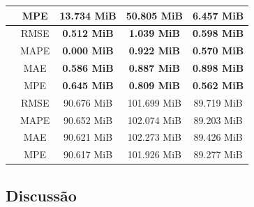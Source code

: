 \begin{table}[!htp]
\begin{tabular}{|c|c|ccc|}
        \rowcolor[HTML]{EFEFEF}
        \multirow{-4}{*}{\cellcolor[HTML]{C0C0C0}ARIMA}   & MPE                                               & \multicolumn{1}{c|}{\cellcolor[HTML]{EFEFEF}13.734 MiB}         & \multicolumn{1}{c|}{\cellcolor[HTML]{EFEFEF}50.805 MiB}         & 6.457 MiB          \\ \hline
        \cellcolor[HTML]{C0C0C0}                          & RMSE                                              & \multicolumn{1}{c|}{\textbf{0.512 MiB}}                         & \multicolumn{1}{c|}{\textbf{1.039 MiB}}                         & \textbf{0.598 MiB} \\ \cline{2-5}
        \rowcolor[HTML]{EFEFEF}
        \cellcolor[HTML]{C0C0C0}                          & MAPE                                              & \multicolumn{1}{c|}{\cellcolor[HTML]{EFEFEF}\textbf{0.000 MiB}} & \multicolumn{1}{c|}{\cellcolor[HTML]{EFEFEF}\textbf{0.922 MiB}} & \textbf{0.570 MiB} \\ \cline{2-5}
        \cellcolor[HTML]{C0C0C0}                          & MAE                                               & \multicolumn{1}{c|}{\textbf{0.586 MiB}}                         & \multicolumn{1}{c|}{\textbf{0.887 MiB}}                         & \textbf{0.898 MiB} \\ \cline{2-5}
        \rowcolor[HTML]{EFEFEF}
        \multirow{-4}{*}{\cellcolor[HTML]{C0C0C0}ReW}     & MPE                                               & \multicolumn{1}{c|}{\cellcolor[HTML]{EFEFEF}\textbf{0.645 MiB}} & \multicolumn{1}{c|}{\cellcolor[HTML]{EFEFEF}\textbf{0.809 MiB}} & \textbf{0.562 MiB} \\ \hline
        \cellcolor[HTML]{C0C0C0}                          & RMSE                                              & \multicolumn{1}{c|}{90.676 MiB}                                 & \multicolumn{1}{c|}{101.699 MiB}                                & 89.719 MiB         \\ \cline{2-5}
        \rowcolor[HTML]{EFEFEF}
        \cellcolor[HTML]{C0C0C0}                          & MAPE                                              & \multicolumn{1}{c|}{\cellcolor[HTML]{EFEFEF}90.652 MiB}         & \multicolumn{1}{c|}{\cellcolor[HTML]{EFEFEF}102.074 MiB}        & 89.203 MiB         \\ \cline{2-5}
        \cellcolor[HTML]{C0C0C0}                          & MAE                                               & \multicolumn{1}{c|}{90.621 MiB}                                 & \multicolumn{1}{c|}{102.273 MiB}                                & 89.426 MiB         \\ \cline{2-5}
        \rowcolor[HTML]{EFEFEF}
        \multirow{-4}{*}{\cellcolor[HTML]{C0C0C0}Prophet} & MPE                                               & \multicolumn{1}{c|}{\cellcolor[HTML]{EFEFEF}90.617 MiB}         & \multicolumn{1}{c|}{\cellcolor[HTML]{EFEFEF}101.926 MiB}        & 89.277 MiB         \\ \hline
    \end{tabular}
\end{table}

\FloatBarrier

\subsection{Discussão}
